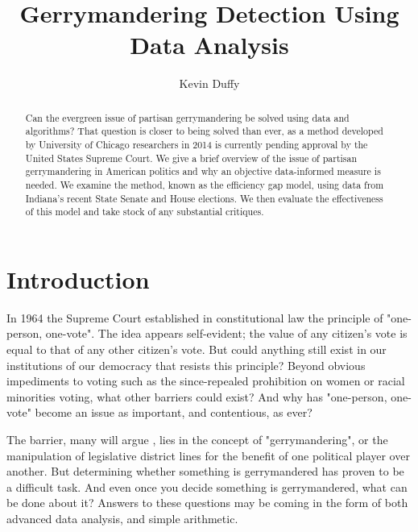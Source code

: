 \documentclass[sigconf]{acmart}
\begin{document}
\title{Gerrymandering Detection Using Data Analysis}

\author{Kevin Duffy}

\renewcommand{\shortauthors}{K. Duffy}

\begin{abstract}
Can the evergreen issue of partisan gerrymandering be solved using data and algorithms? That question is closer to being solved than ever, as a method developed by University of Chicago researchers in 2014 is currently pending approval by the United States Supreme Court. We give a brief overview of the issue of partisan gerrymandering in American politics and why an objective data-informed measure is needed. We examine the method, known as the efficiency gap model, using data from Indiana's recent State Senate and House elections. We then evaluate the effectiveness of this model and take stock of any substantial critiques.
\end{abstract}


\maketitle

\section{Introduction}
In 1964 the Supreme Court established in constitutional law the principle of "one-person, one-vote".\cite{oneperson} The idea appears self-evident; the value of any citizen's vote is equal to that of any other citizen's vote. But could anything still exist in our institutions of our democracy that resists this principle? Beyond obvious impediments to voting such as the since-repealed prohibition on women or racial minorities voting, what other barriers could exist? And why has "one-person, one-vote" become an issue as important, and contentious, as ever?

The barrier, many will argue \cite{wapo}\cite{chicago}\cite{thornburg}, lies in the concept of "gerrymandering", or the manipulation of legislative district lines for the benefit of one political player over another. But determining whether something is gerrymandered has proven to be a difficult task. And even once you decide something is gerrymandered, what can be done about it? Answers to these questions may be coming in the form of both advanced data analysis, and simple arithmetic.
\end{document}
